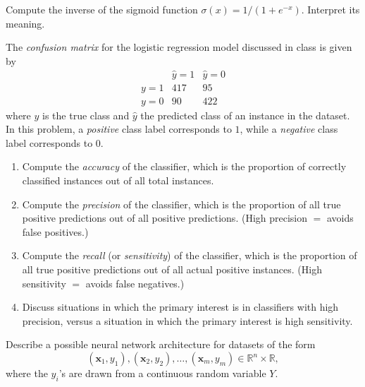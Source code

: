 \documentclass[12pt,reqno]{amsart}
\begin{document}
\vfill
\prob Compute the inverse of the sigmoid function $\sigma(x) = 1/(1+e^{-x})$. Interpret its meaning.













\vfill
\newpage
\prob The \textit{confusion matrix} for the logistic regression model discussed in class is given by
	\[\begin{array}{c|cc}
	& \hat{y}=1 & \hat{y} = 0 \\ \hline
	y=1 & 417 & 95 \\
	y=0 & 90 & 422
	\end{array}
	\]
where $y$ is the true class and $\hat{y}$ the predicted class of an instance in the dataset. In this problem, a \textit{positive} class label corresponds to $1$, while a \textit{negative} class label corresponds to $0$.

\medskip
\begin{enumerate}
\item Compute the \textit{accuracy} of the classifier, which is the proportion of correctly classified instances out of all total instances.\vfill
\item Compute the \textit{precision} of the classifier, which is the proportion of all true positive predictions out of all positive predictions. (High precision $=$ avoids false positives.)\vfill
\item Compute the \textit{recall} (or \textit{sensitivity}) of the classifier, which is the proportion of all true positive predictions out of all actual positive instances. (High sensitivity $=$ avoids false negatives.)\vfill
\item Discuss situations in which the primary interest is in classifiers with high precision, versus a situation in which the primary interest is high sensitivity.
\end{enumerate}







\vfill
\prob Describe a possible neural network architecture for datasets of the form
	\[(\mathbf{x}_1,y_1),(\mathbf{x}_2,y_2),\ldots,(\mathbf{x}_m,y_m) \in \mathbb{R}^n \times \mathbb{R},
	\]
where the $y_i$'s are drawn from a continuous random variable $Y$.

\vfill
\end{document}
